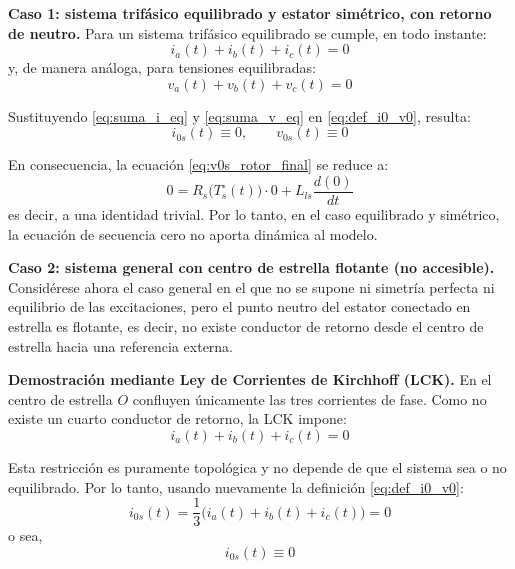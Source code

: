 \documentclass[12pt, a4paper,journal, onecolumn, compsoc]{IEEEtran}
\begin{document}
    \textbf{Caso 1: sistema trifásico equilibrado y estator simétrico, con retorno de neutro.}
    Para un sistema trifásico equilibrado se cumple, en todo instante:
    \begin{equation}
        i_a(t)+i_b(t)+i_c(t)=0
        \label{eq:suma_i_eq}
    \end{equation}
    y, de manera análoga, para tensiones equilibradas:
    \begin{equation}
        v_a(t)+v_b(t)+v_c(t)=0
        \label{eq:suma_v_eq}
    \end{equation}

    Sustituyendo \eqref{eq:suma_i_eq} y \eqref{eq:suma_v_eq} en \eqref{eq:def_i0_v0}, resulta:
    \begin{equation}
        i_{0s}(t)\equiv 0,
        \qquad
        v_{0s}(t)\equiv 0
    \end{equation}

    En consecuencia, la ecuación \eqref{eq:v0s_rotor_final} se reduce a:
    \begin{equation}
        0=R_s\!\big(T_s^\circ(t)\big)\cdot 0 + L_{ls}\frac{d(0)}{dt}
    \end{equation}
    es decir, a una identidad trivial. Por lo tanto, en el caso equilibrado y simétrico, la ecuación de secuencia cero no aporta dinámica al modelo.

    \textbf{Caso 2: sistema general con centro de estrella flotante (no accesible).}
    Considérese ahora el caso general en el que no se supone ni simetría perfecta ni equilibrio de las excitaciones, pero el punto neutro del estator conectado en estrella es flotante, es decir, no existe conductor de retorno desde el centro de estrella hacia una referencia externa.

    \textbf{Demostración mediante Ley de Corrientes de Kirchhoff (LCK).}
    En el centro de estrella \(O\) confluyen únicamente las tres corrientes de fase. Como no existe un cuarto conductor de retorno, la LCK impone:
    \begin{equation}
        i_a(t)+i_b(t)+i_c(t)=0
        \label{eq:LCK_neutro_flotante}
    \end{equation}

    Esta restricción es puramente topológica y no depende de que el sistema sea o no equilibrado. Por lo tanto, usando nuevamente la definición \eqref{eq:def_i0_v0}:
    \begin{equation}
        i_{0s}(t)=\frac{1}{3}\Big(i_a(t)+i_b(t)+i_c(t)\Big)=0
    \end{equation}
    o sea,
    \begin{equation}
        \boxed{i_{0s}(t)\equiv 0}
        \label{eq:i0_neutro_flotante}
    \end{equation}
\end{document}
